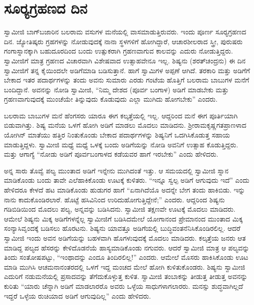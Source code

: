 
\chapter{ಸೂರ‍್ಯಗ್ರಹಣದ ದಿನ}

ಸ್ವಾಮೀಜಿ ಬಾಗ್‍ಬಜಾರಿನ ಬಲರಾಮ ವಸುಗಳ ಮನೆಯಲ್ಲಿ ವಾಸಮಾಡುತ್ತಿರುವರು. ಇಂದು ಪೂರ್ಣ ಸೂರ‍್ಯಗ್ರಹಣದ ದಿನ. ಜ್ಯೋತಿಷ್ಕರು ಗ್ರಹಗಳನ್ನು ನೋಡುವುದಕ್ಕೆ ನಾನಾ ಸ್ಥಳಗಳಿಗೆ ಹೋಗಿದ್ದಾರೆ, ಆಚಾರಶೀಲರಾದ ಸ್ತ್ರೀ, ಪುರುಷರು ಗಂಗಾಸ್ನಾನಕ್ಕಾಗಿ ಬಹುದೂರದಿಂದ ಬಂದು ಉತ್ಸುಕರಾಗಿ ಗ್ರಹಣವಾಗುವ ಕಾಲವನ್ನು ಎದುರು ನೋಡುತ್ತಿದ್ದರು. ಸ್ವಾಮೀಜಿಗೆ ಮಾತ್ರ ಗ್ರಹಣದ ವಿಚಾರವಾಗಿ ವಿಶೇಷವಾದ ಉತ್ಸಾಹವೇನೂ ಇಲ್ಲ. ಶಿಷ್ಯನು (ಶರತ್‍ಚಂದ್ರನು) ಈ ದಿನ ಸ್ವಾಮೀಜಿಗೆ ತನ್ನ ಕೈಯಿಂದಲೇ ಅಡಿಗೆಮಾಡಿ ಬಡಿಸುತ್ತಾನೆ. ಹಾಗೆ ಸ್ವಾಮಿಗಳ ಅಪ್ಪಣೆ ಆಗಿದೆ. ತರಕಾರಿ ಮತ್ತು ಅಡಿಗೆಗೆ ಬೇಕಾದ ಇತರ ಪದಾರ್ಥಗಳನ್ನು ತಂದು ಅವನು ಸುಮಾರು ಎರಡು ಗಂಟೆಯ ಹೊತ್ತಿಗೆ ಬಲರಾಮ ಬಾಬುಗಳ ಮನೆಗೆ ಬಂದಿದ್ದಾನೆ. ಅವನನ್ನು ನೋಡಿ ಸ್ವಾಮೀಜಿ, “ನಿಮ್ಮ ದೇಶದ (ಪೂರ್ವ ಬಂಗಾಳ) ಅಡಿಗೆ ಮಾಡಬೇಕು ಮತ್ತು ಗ್ರಹಣವಾಗುವುದಕ್ಕೆ ಮುಂಚೆಯೇ ತಿನ್ನುವುದು ಕೊಡುವುದು ಎಲ್ಲಾ ಮುಗಿದು ಹೋಗಬೇಕು” ಎಂದರು. 

 ಬಲರಾಮ ಬಾಬುಗಳ ಮನೆ ಹೆಂಗಸರು ಯಾರೂ ಈಗ ಕಲ್ಕತ್ತೆಯಲ್ಲಿ ಇಲ್ಲ. ಆದ್ದರಿಂದ ಮನೆ ಈಗ ಪೂರ್ತಿಯಾಗಿ ಬಿಡುವಾಗಿತ್ತು. ಶಿಷ್ಯ ಮನೆಯ ಒಳಗೆ ಹೋಗಿ ಅಡಿಗೆ ಮಾಡಲು ಮೊದಲು ಮಾಡಿದನು. ಶ‍್ರೀರಾಮಕೃಷ್ಣಗತಪ್ರಾಣಳಾದ ಯೋಗಿನ್ ಮಾತೆಯು ಹತ್ತಿರ ನಿಂತುಕೊಂಡು ಬೇಕಾದ ಪದಾರ್ಥಗಳನ್ನು ಶಿಷ್ಯನಿಗೆ ಒದಗಿಸಿಕೊಡುತ್ತ ಸಹಾಯ ಮಾಡುತ್ತಿದ್ದಳು. ಸ್ವಾಮೀಜಿ ಮಧ್ಯೆ ಮಧ್ಯೆ ಒಳಕ್ಕೆ ಬಂದು ಅಡಿಗೆಯನ್ನು ನೋಡಿ ಅವನಿಗೆ ಉತ್ಸಾಹ ಕೊಡುತ್ತಿದ್ದರು. ಮತ್ತು ಆಗಾಗ್ಯೆ “ನೋಡು ಅಡಿಗೆ ಪೂರ್ವಬಂಗಾಳದ ಕಡೆಯವರ ಹಾಗೆ ಇರಬೇಕು” ಎಂದು ಹೇಳಿದರು. 

 ಅನ್ನ ಸಾರು ತೊವ್ವೆ ಪಲ್ಯ ಮುಂತಾದ ಅಡಿಗೆ ಇನ್ನೇನು ಮುಗಿದಂತೆ ಇತ್ತು. ಆ ಸಮಯದಲ್ಲಿ ಸ್ವಾಮೀಜಿ ಸ್ನಾನ ಮಾಡಿಕೊಂಡು ಬಂದು ತಾವೇ ಎಲೆಹಾಕಿಕೊಂಡು ಊಟಕ್ಕೆ ಕುಳಿತರು. “ಇನ್ನೂ ಸ್ವಲ್ಪ ಅಡಿಗೆ ಆಗುವುದು ಇದೆ” ಎಂದು ಹೇಳಿದರೂ ಕೇಳದೆ ಹಟ ಮಾಡಿಕೊಂಡು ಹುಡುಗರ ಹಾಗೆ “ಏನಾಗಿದೆಯೊ ಅದನ್ನೇ ಬೇಗ ತಂದು ಹಾಕಿಬಿಡು. ಇನ್ನು ನಾನು ಕಾದುಕೊಂಡಿರಲಾರೆ. ಹೊಟ್ಟೆ ಹಸಿವಿನಿಂದ ಉರಿದುಹೋಗುತ್ತಿದ್ದೇನೆ;” ಎಂದರು. ಆದ್ದರಿಂದ ಶಿಷ್ಯನು ಗಡಿಬಿಡಿಯಿಂದ ಮೊದಲು ಪಲ್ಯ, ಅನ್ನವನ್ನು ಬಡಿಸಿದನು. ಸ್ವಾಮೀಜಿ ತಕ್ಷಣವೇ ಊಟಕ್ಕೆ ಮೊದಲು ಮಾಡಿದರು. ಆಮೇಲೆ ಶಿಷ್ಯನು ಮಿಕ್ಕ ಅಡಿಗೆಗಳನ್ನೆಲ್ಲ ಸ್ವಾಮೀಜಿಗೆ ಬಡಿಸಿದಮೇಲೆ ಯೋಗಾನಂದ ಪ್ರೇಮಾನಂದ ಮುಂತಾದ ಮಿಕ್ಕ ಸಂನ್ಯಾಸಿವೃಂದಕ್ಕೆ ಬಡಿಸಲು ಹೊರಟನು. ಶಿಷ್ಯನು ಯಾವತ್ತೂ ಅಡಿಗೆಯಲ್ಲಿ ಬುದ್ಧಿವಂತನೆನಿಸಿಕೊಂಡಿರಲಿಲ್ಲ. ಆದರೆ ಸ್ವಾಮೀಜಿ ಇಂದು ಅವನ ಅಡಿಗೆಯನ್ನು ಬಹಳವಾಗಿ ಹೊಗಳುವುದಕ್ಕೆ ಮೊದಲು ಮಾಡಿದರು. ಕಲ್ಕತ್ತೆಯ ಜನರು ಆತ ಮಾಡಿದ್ದ ಪಲ್ಯದ ಹೆಸರನ್ನು ಕೇಳಿದೊಡನೆಯೆ ಹಾಸ್ಯಮಾಡಿಕೊಂಡು ನಗುವರು. ಆದರೆ ಸ್ವಾಮೀಜಿ ಮಾತ್ರ ಆ ಪಲ್ಯವನ್ನು ತಿಂದು ಸಂತೋಷಪಟ್ಟು, “ಇಂಥಾದನ್ನು ಎಂದೂ ತಿಂದಿರಲಿಲ್ಲ!” ಎಂದರು. ಆಮೇಲೆ ಮೊಸರು ಹಾಕಿಸಿಕೊಂಡು ಊಟ ಮಾಡಿ ಮುಗಿಸಿ ಆಚಮನಾನಂತರದಲ್ಲಿ ಒಳಗೆ ಇದ್ದ ಮಂಚದ ಮೇಲೆ ಹೋಗಿ ಕುಳಿತುಕೊಂಡರು. ಶಿಷ್ಯನು ಸ್ವಾಮೀಜಿ ಎದುರಿಗೆ ನಡುಮನೆಯಲ್ಲಿ ಪ್ರಸಾದವನ್ನು ತೆಗೆದುಕೊಳ್ಳುತ್ತ ಕುಳಿತ. ಸ್ವಾಮೀಜಿ ತಂಬಾಕನ್ನು ತೀಡುತ್ತ ತೀಡುತ್ತ ಅವನನ್ನು ಕುರಿತು “ಯಾರು ಚೆನ್ನಾಗಿ ಅಡಿಗೆ ಮಾಡಲಾರರೊ ಅವರು ಒಳ್ಳೆಯ ಸಾಧುಗಳಾಗಲಾರರು. ಮನಸ್ಸು ಶುದ್ಧವಾಗಿಲ್ಲದೆ ಇದ್ದರೆ ಒಳ್ಳೆಯ ರುಚಿಯಾದ ಅಡಿಗೆ ಆಗುವುದಿಲ್ಲ” ಎಂದು ಹೇಳಿದರು. 

